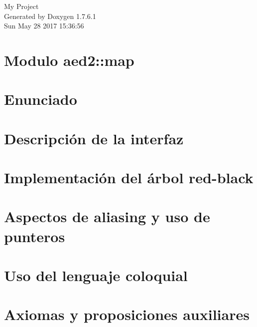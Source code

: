 \documentclass[a4paper]{book}
\begin{document}
\hypersetup{pageanchor=false,citecolor=blue}
\begin{titlepage}
\vspace*{7cm}
\begin{center}
{\Large \-My \-Project }\\
\vspace*{1cm}
{\large \-Generated by Doxygen 1.7.6.1}\\
\vspace*{0.5cm}
{\small Sun May 28 2017 15:36:56}\\
\end{center}
\end{titlepage}
\clearemptydoublepage
{}
\tableofcontents
\clearemptydoublepage
{}
\hypersetup{pageanchor=true,citecolor=blue}
\chapter{\-Modulo aed2\-:\-:map}
\label{index}\hypertarget{index}{}
\chapter{\-Enunciado}
\label{Enunciado}
\hypertarget{Enunciado}{}

\chapter{\-Descripción de la interfaz}
\label{Interfaz}
\hypertarget{Interfaz}{}

\chapter{\-Implementación del árbol red-\/black}
\label{Implementacion}
\hypertarget{Implementacion}{}

\chapter{\-Aspectos de aliasing y uso de punteros}
\label{Aliasing}
\hypertarget{Aliasing}{}

\chapter{\-Uso del lenguaje coloquial}
\label{Castellano}
\hypertarget{Castellano}{}

\chapter{\-Axiomas y proposiciones auxiliares}
\label{axiomas}
\hypertarget{axiomas}{}

\end{document}
